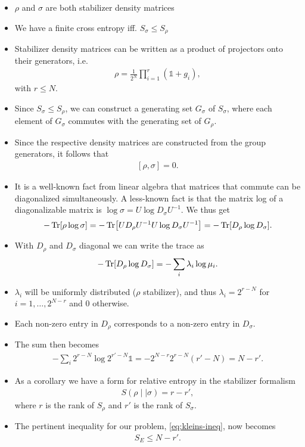 \begin{itemize}
  \item $\rho$ and $\sigma$ are both stabilizer density matrices
  \item We have a finite cross entropy iff. $S_\sigma \leq S_\rho$
  \item Stabilizer density matrices can be written as a product of projectors
    onto their generators, i.e.
    \begin{align}
    \rho = \frac{1}{2^N}\prod_{i=1}^r \left(\mathds{1} + g_i\right)
    ,\end{align}
    with $r\leq N$.
  \item Since $S_\sigma \leq S_\rho$, we can construct a generating set
    $G_\sigma$ of $S_\sigma$, where each element of $G_\sigma$ commutes with
    the generating set of $G_\rho$.
  \item Since the respective density matrices are constructed from the group
    generators, it follows that
    \begin{align}
      \left[\rho, \sigma\right] = 0
    .\end{align}
  \item It is a well-known fact from linear algebra that matrices that commute
    can be diagonalized simultaneously. A less-known fact is that the matrix
    log of a diagonalizable matrix is $\log\sigma = U \log D_\sigma U^{-1}$. We
    thus get
    \begin{align}
      -\Tr[\rho \log\sigma] = -\Tr[U D_\rho U^{-1} U \log D_\sigma U^{-1}] =
      -\Tr[D_\rho \log D_\sigma] 
    .\end{align}
  \item With $D_\rho$ and $D_\sigma$ diagonal we can write the trace as
    \begin{align}
      -\Tr[D_\rho \log D_\sigma] = -\sum_i \lambda_i \log \mu_i
    .\end{align}
  \item $\lambda_i$ will be uniformly distributed ($\rho$ stabilizer), and thus
    $\lambda_i = 2^{r-N}$ for $i=1,\ldots,2^{N-r}$ and $0$ otherwise.
  \item Each non-zero entry in $D_\rho$ corresponds to a non-zero entry in
    $D_\sigma$. 
  \item The sum then becomes
    \begin{align}
      -\sum_i 2^{r-N} \log 2^{r'-N} \mathds{1} =
      -2^{N-r}2^{r-N}\left(r'-N\right)= N-r'
    .\end{align}
  \item As a corollary we have a form for relative entropy in the stabilizer
    formalism
    \begin{align}
      S(\rho \mid\mid \sigma) = r - r'
    ,\end{align}
    where $r$ is the rank of $S_\rho$ and $r'$ is the rank of $S_\sigma$.
  \item The pertinent inequality for our problem, \cref{eq:kleins-ineq}, now
    becomes
    \begin{align}
      S_E \leq N-r'
    .\end{align}
\end{itemize}

